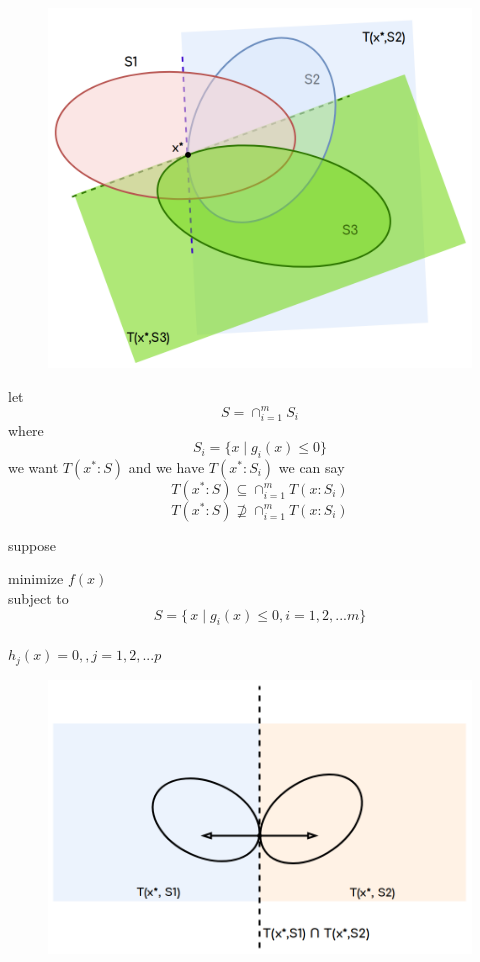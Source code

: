 \documentclass[twoside]{article}
\begin{document}
\begin{figure}[h]
\center
\includegraphics[scale=0.25]{images/pic5.png}
\end{figure}
let $$S = \cap^{m}_{i=1}S_i$$ where $$S_i = \{ x\mid g_i(x)\leq 0\}$$
we want $T(x^*:S)$ and we have $T(x^*:S_i)$
we can say $$T(x^*:S) \subseteq \cap_{i=1}^{m}T(x:S_i)$$
$$T(x^*:S)\nsupseteq \cap_{i=1}^{m}T(x:S_i)$$

suppose 
\begin{center}
minimize $f(x)$\\
subject to $$S = \{\,x\mid g_{i}(x)\leq 0 , i = 1,2,...m\}$$\\
$h_j(x) = 0, , j = 1,2,...p$
\end{center}

\begin{figure}[h]
\center
\includegraphics[scale=0.25]{images/pic6.png}
\end{figure}
\end{document}

